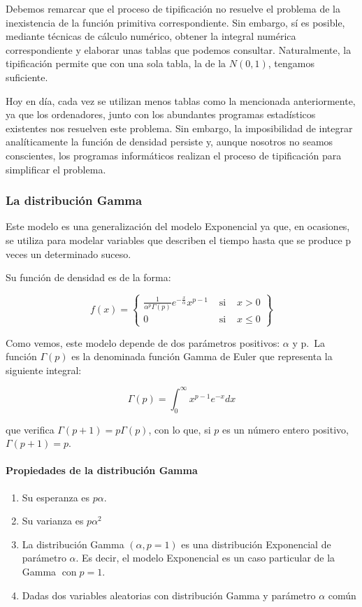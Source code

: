 \documentclass[
]{article}
\begin{document}
Debemos remarcar que el proceso de tipificación no resuelve el problema de la inexistencia de la función primitiva correspondiente. Sin embargo, sí es posible, mediante técnicas de cálculo numérico, obtener la integral numérica correspondiente y elaborar unas tablas que podemos consultar. Naturalmente, la tipificación permite que con una sola tabla, la de la \(N(0,1)\), tengamos suficiente.

Hoy en día, cada vez se utilizan menos tablas como la mencionada anteriormente, ya que los ordenadores, junto con los abundantes programas estadísticos existentes nos resuelven este problema. Sin embargo, la imposibilidad de integrar analíticamente la función de densidad persiste y, aunque nosotros no seamos conscientes, los programas informáticos realizan el proceso de tipificación para simplificar el problema.

\subsubsection{La distribución Gamma}\label{la-distribuciuxf3n-gamma}

Este modelo es una generalización del modelo Exponencial ya que, en ocasiones, se utiliza para modelar variables que describen el tiempo hasta que se produce p veces un determinado suceso.

Su función de densidad es de la forma:

\[
f(x)=\left\{\begin{array}{lll}
\frac{1}{\alpha^{p} \Gamma(p)} e^{-\frac{x}{\alpha}} x^{p-1} & \text { si } & x>0 \\
0 & \text { si } & x \leq 0
\end{array}\right\}
\]

Como vemos, este modelo depende de dos parámetros positivos: \(\alpha\) y p.~La función \(\Gamma(p)\) es la denominada función Gamma de Euler que representa la siguiente integral:

\[
\Gamma(p)=\int_{0}^{\infty} x^{p-1} e^{-x} d x
\]

que verifica \(\Gamma(p+1)=p \Gamma(p)\), con lo que, si \(p\) es un número entero positivo, \(\Gamma(p+1)=p\).

\paragraph{Propiedades de la distribución Gamma}\label{propiedades-de-la-distribuciuxf3n-gamma}

\begin{enumerate}
\def\labelenumi{\arabic{enumi}.}
\item
  Su esperanza es \(p \alpha\).
\item
  Su varianza es \(p \alpha^{2}\)
\item
  La distribución Gamma \((\alpha, p=1)\) es una distribución Exponencial de parámetro \(\alpha\). Es decir, el modelo Exponencial es un caso particular de la Gamma \(\operatorname{con} p=1\).
\item
  Dadas dos variables aleatorias con distribución Gamma y parámetro \(\alpha\) común
\end{enumerate}
\end{document}
